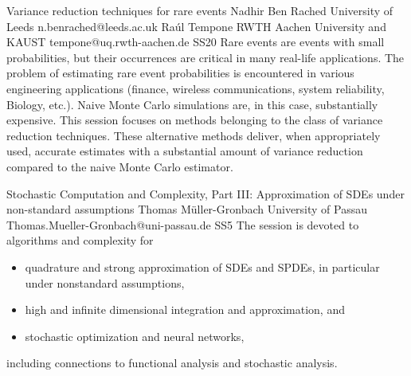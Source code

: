 \documentclass[12pt,a4paper,figuresright]{book}
\begin{document}
%



\clearpage
\begin{session}
 {Variance reduction techniques for rare events}%
 {Nadhir Ben Rached}%
 {University of Leeds}%
 {n.benrached@leeds.ac.uk}%
 {Ra\'{u}l Tempone}%
 {RWTH Aachen University and KAUST}%
 {tempone@uq.rwth-aachen.de}%
 {SS20}%
 {}%
Rare events are events with small probabilities, but their occurrences are critical in many real-life applications. The problem of estimating rare event probabilities is encountered in various engineering applications (finance, wireless communications, system reliability, Biology, etc.). Naive Monte Carlo simulations are, in this case, substantially expensive. This session focuses on methods belonging to the class of variance reduction techniques. These alternative methods deliver, when appropriately used, accurate estimates with a substantial amount of variance reduction compared to the naive Monte Carlo estimator.
\end{session}




\clearpage

\begin{session}
 {Stochastic Computation and Complexity, Part III: Approximation of SDEs under non-standard assumptions}%
 {Thomas M\"uller-Gronbach}%
 {University of Passau}%
 {Thomas.Mueller-Gronbach@uni-passau.de}%
 {}%
 {}%
 {}%
 {SS5}
 {}%
The session is devoted to algorithms and complexity for
\begin{itemize}[itemsep=0pt,topsep=0pt]
 \item quadrature and strong approximation of SDEs and SPDEs, in particular under nonstandard assumptions,

 \item high and infinite dimensional integration and approximation, and

 \item stochastic optimization and neural networks,
\end{itemize}
including connections to functional analysis and stochastic analysis.
\end{session}
\end{document}
